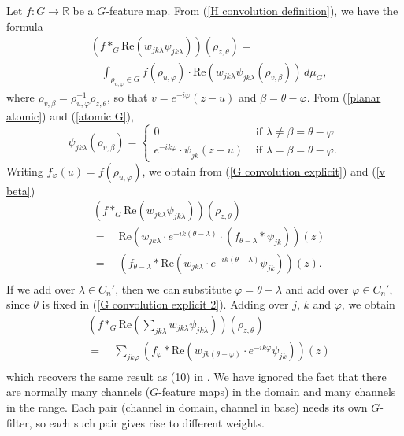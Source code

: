 \documentclass[journal]{IEEEtran}
\newcommand\reals{\mathbb{R}}
\renewcommand\Re{\mathrm{Re}}
\newcommand\inG[2]{\rho_{#1,#2}}
\begin{document}
{	 Let $f:G\to\reals$ be a $G$-feature map. From (\ref{H convolution definition}), we have the formula
	 \begin{equation}\label{G convolution explicit}
	 \begin{split}
	     &\left(f \ast_G \Re(w_{jk\lambda}\psi_{jk\lambda})\right)(\inG z\theta)=\\
	     &\quad\int_{\inG u\varphi\in G}
	     f(\inG u\varphi)\cdot\Re(w_{jk\lambda}\psi_{jk\lambda} (\inG v\beta))\,d\mu_G,
	     \end{split}
	 \end{equation}
	 where
	 $\inG v\beta = \inG u{\varphi}^{-1}\inG z\theta$, so that $v=e^{-i\varphi}(z-u)$ and $\beta=\theta-\varphi$.
	 From (\ref{planar atomic}) and (\ref{atomic G}),
	 \begin{equation}\label{v beta}
	     \psi_{jk\lambda}(\inG v\beta) = \begin{cases}
	     0&\text{ if } \lambda\neq \beta=\theta -\varphi\\
	     e^{-ik\varphi}\cdot\psi_{jk}(z-u)&\text{ if }\lambda=\beta=\theta - \varphi.
	     \end{cases}
	 \end{equation}
	 Writing $ f_\varphi(u) = f(\inG u\varphi)$, we obtain from (\ref{G convolution explicit}) and (\ref{v beta})
	 \begin{equation}\label{G convolution explicit 2}
	 \begin{split}
	     &\left(f \ast_G \Re(w_{jk\lambda}\psi_{jk\lambda})\right)(\inG z\theta)\\
	     &=\quad\Re\left(w_{jk\lambda}\cdot e^{-ik(\theta-\lambda)} \cdot
	     (f_{\theta-\lambda}\ast \psi_{jk}) \right)(z) \\
	    &=\quad \left(f_{\theta-\lambda} \ast \Re(w_{jk\lambda}\cdot e^{-ik(\theta-\lambda)} \psi_{jk})\right)(z).\\
	 \end{split}
	 \end{equation}
	 If we add over $\lambda\in C_n'$, then we can substitute $\varphi = \theta-\lambda$ and add over $\varphi\in C_n'$, since $\theta$ is fixed in (\ref{G convolution explicit 2}).
	 Adding over $j$, $k$ and $\varphi$, we obtain
	 \begin{equation}\label{G convolution 3}
	 \begin{split}
	     &\left(f \ast_G \Re(\sum_{jk\lambda}w_{jk\lambda}\psi_{jk\lambda})\right)(\inG z\theta)\\
	    &=\quad \sum_{jk\varphi}\left(f_\varphi \ast \Re\left(w_{jk(\theta-\varphi)}\cdot e^{-ik\varphi} \psi_{jk}\right)\right)(z)\\
	 \end{split}
	 \end{equation}
	 which recovers the same result as (10) in \cite{weiler2018learning}. We have ignored the fact that there are normally many channels ($G$-feature maps) in the domain and many channels in the range. Each pair (channel in domain, channel in base) needs its own $G$-filter, so each such pair gives rise to different weights.
	 }
	
\end{document}
